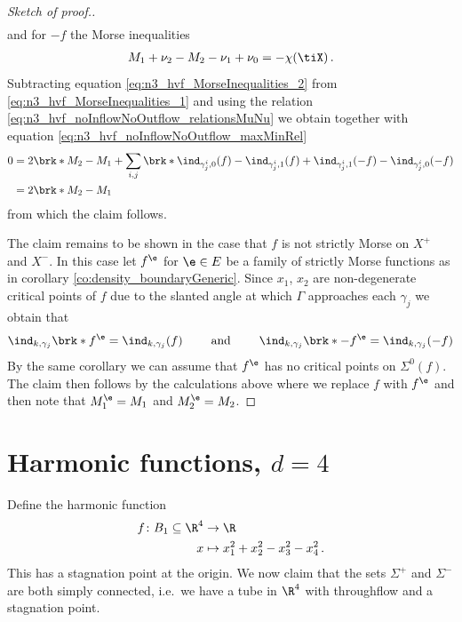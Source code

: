 \begin{proof}[Sketch of proof.]
\begin{align}
  \end{align}
  and for $-f$ the Morse inequalities
  \begin{align}
    M_1+\nu_2-M_2-\nu_1+\nu_0=-\chi(\tiX) \label{eq:n3_hvf_MorseInequalities_2}\,.
  \end{align}
  Subtracting equation \eqref{eq:n3_hvf_MorseInequalities_2} from \eqref{eq:n3_hvf_MorseInequalities_1} and using the relation
  \eqref{eq:n3_hvf_noInflowNoOutflow_relationsMuNu} we obtain
  together with equation \eqref{eq:n3_hvf_noInflowNoOutflow_maxMinRel}
  \begin{align*}
    0&=2\brk*{M_2-M_1}
    +\sum_{i,j}\brk*{\ind_{\gamma_j^i,0}(f)
    -\ind_{\gamma_j^i,1}(f)
    +\ind_{\gamma_j^i,1}(-f)
    -\ind_{\gamma_j^i,0}(-f)} \\
    &=2\brk*{M_2-M_1}
  \end{align*}
  from which the claim follows.

  The claim remains to be shown in the case that $f$ is not strictly Morse on $X^+$ and $X^-$. In this case let
  $f^\e$ for $\e\in E$ be a family of strictly Morse functions as in corollary \ref{co:density_boundaryGeneric}.
  Since $x_1$, $x_2$ are non-degenerate critical points of $f$
  due to the slanted angle at which
  $\Gamma$ approaches each $\gamma_j$
  we obtain that
  \begin{align}
    \ind_{k,\gamma_j}\brk*{f^\e}=\ind_{k,\gamma_j}(f)\qquad\text{ and }\qquad 
    \ind_{k,\gamma_j}\brk*{-f^\e}=\ind_{k,\gamma_j}(-f)
    \label{eq:n3_hvf_noInflowNoOutflow_morse_indexApprox}
  \end{align}
  By the same corollary we can assume that $f^\e$ has no critical points on
  $\Sigma^0(f)$.
  The claim then follows by the calculations above where we replace
  $f$ with $f^\e$ and then note that $M_1^\e=M_1$ and $M_2^\e=M_2$.
\end{proof}

\chapter{Harmonic functions, $d=4$} 
Define the harmonic function 
\begin{align*}
  f\colon B_1\subseteq\R^4&\to \R \\
  x &\mapsto x_1^2+x_2^2-x_3^2-x_4^2\,.
\end{align*}
This has a stagnation point at the origin. We now claim that the sets $\Sigma^+$ and $\Sigma^-$ are both simply connected, i.e.\
we have a tube in $\R^4$ with throughflow and a stagnation point.

